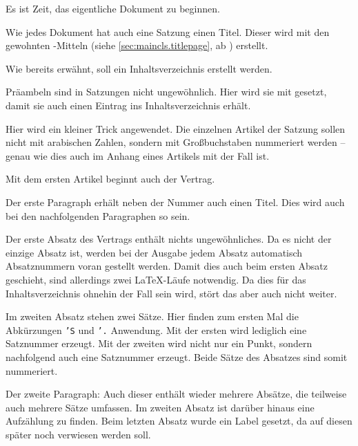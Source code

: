 %
Es ist Zeit, das eigentliche Dokument zu beginnen.

%
Wie jedes Dokument hat auch eine Satzung einen Titel. Dieser wird mit den
gewohnten \KOMAScript-Mitteln (siehe \autoref{sec:maincls.titlepage}, ab
) erstellt.

%
Wie bereits erwähnt, soll ein Inhaltsverzeichnis erstellt werden.

%
Präambeln sind in Satzungen nicht ungewöhnlich. Hier wird sie mit
 gesetzt, damit sie auch einen Eintrag ins
Inhaltsverzeichnis erhält.

%
Hier wird ein kleiner Trick angewendet. Die einzelnen Artikel der Satzung
sollen nicht mit arabischen Zahlen, sondern mit Großbuchstaben nummeriert
werden -- genau wie dies auch im Anhang eines Artikels mit 
der Fall ist.

%
Mit dem ersten Artikel beginnt auch der Vertrag.

%
Der erste Paragraph erhält neben der Nummer auch einen Titel. Dies wird auch
bei den nachfolgenden Paragraphen so sein. 

Der erste Absatz des Vertrags enthält nichts ungewöhnliches. Da es nicht der
einzige Absatz ist, werden bei der Ausgabe jedem Absatz automatisch
Absatznummern voran gestellt werden. Damit dies auch beim ersten Absatz
geschieht, sind allerdings zwei \LaTeX-Läufe notwendig. Da dies für das
Inhaltsverzeichnis ohnehin der Fall sein wird, stört das aber auch nicht
weiter.

Im zweiten Absatz stehen zwei Sätze. Hier finden zum ersten Mal die
Abkürzungen \texttt{'S} und
\texttt{'.} Anwendung. Mit der ersten wird lediglich eine Satznummer
erzeugt. Mit der zweiten wird nicht nur ein Punkt, sondern nachfolgend
auch eine Satznummer erzeugt. Beide Sätze des Absatzes sind somit nummeriert.

%
Der zweite Paragraph: Auch dieser enthält wieder mehrere Absätze, die
teilweise auch mehrere Sätze umfassen. Im zweiten Absatz ist darüber hinaus
eine Aufzählung zu finden. Beim letzten Absatz wurde ein Label gesetzt, da auf
diesen später noch verwiesen werden soll.

